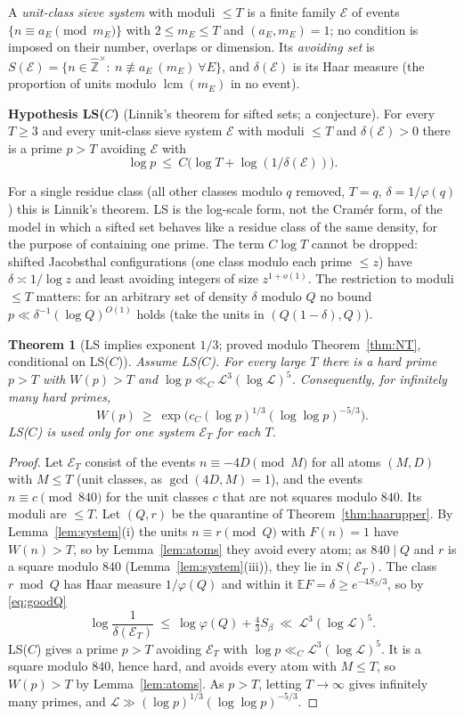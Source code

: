 \documentclass[11pt,reqno]{amsart}
\newtheorem{theorem}{Theorem}[section]
\theoremstyle{definition}
\newcommand{\lcm}{\operatorname{lcm}}
\newcommand{\Lc}{\mathcal L}
\newcommand{\E}{\mathbb E}
\begin{document}
A \emph{unit-class sieve system} with moduli $\le T$ is a finite family $\mathcal E$ of
events $\{n\equiv a_E\pmod{m_E}\}$ with $2\le m_E\le T$ and $(a_E,m_E)=1$; no condition is
imposed on their number, overlaps or dimension.  Its \emph{avoiding set} is
$S(\mathcal E)=\{n\in\hat{\mathbb Z}^\times:\ n\not\equiv a_E\ (m_E)\ \forall E\}$, and $\delta(\mathcal E)$ is its Haar
measure (the proportion of units modulo $\lcm(m_E)$ in no event).

\smallskip\noindent\textbf{Hypothesis LS($C$)} (Linnik's theorem for sifted
sets; a conjecture).  For every $T\ge3$ and every unit-class sieve system $\mathcal E$
with moduli $\le T$ and $\delta(\mathcal E)>0$ there is a prime $p>T$ avoiding $\mathcal E$ with
\[
 \log p\ \le\ C\big(\log T+\log(1/\delta(\mathcal E))\big).
\]

For a single residue class (all other classes modulo $q$ removed, $T=q$,
$\delta=1/\varphi(q)$) this is Linnik's theorem.  LS is the log-scale form, not the
Cram\'er form, of the model in which a sifted set behaves like a residue
class of the same density, for the purpose of containing one prime.  The
term $C\log T$ cannot be dropped: shifted Jacobsthal configurations (one
class modulo each prime $\le z$) have $\delta\asymp1/\log z$ and least avoiding
integers of size $z^{1+o(1)}$.  The restriction to moduli $\le T$ matters: for an
arbitrary set of density $\delta$ modulo $Q$ no bound $p\ll\delta^{-1}(\log Q)^{O(1)}$ holds
(take the units in $(Q(1-\delta),Q)$).

\begin{theorem}[LS implies exponent $1/3$; proved modulo Theorem~\ref{thm:NT}, conditional on LS($C$)]\label{thm:LS}
Assume LS($C$).  For every large $T$ there is a hard prime $p>T$ with
$W(p)>T$ and $\log p\ll_C\Lc^3(\log\Lc)^5$.  Consequently, for infinitely many hard
primes,
\[
 W(p)\ \ge\ \exp\big(c_C(\log p)^{1/3}(\log\log p)^{-5/3}\big).
\]
LS($C$) is used only for one system $\mathcal E_T$ for each $T$.
\end{theorem}

\begin{proof}
Let $\mathcal E_T$ consist of the events $n\equiv-4D\pmod M$ for all atoms $(M,D)$ with
$M\le T$ (unit classes, as $\gcd(4D,M)=1$), and the events $n\equiv c\pmod{840}$ for
the unit classes $c$ that are not squares modulo $840$.  Its moduli are
$\le T$.  Let $(Q,r)$ be the quarantine of Theorem~\ref{thm:haarupper}.  By
Lemma~\ref{lem:system}(i) the units $n\equiv r\pmod Q$ with $F(n)=1$ have $W(n)>T$,
so by Lemma~\ref{lem:atoms} they avoid every atom; as $840\mid Q$ and $r$ is a
square modulo $840$ (Lemma~\ref{lem:system}(iii)), they lie in $S(\mathcal E_T)$.  The
class $r\bmod Q$ has Haar measure $1/\varphi(Q)$ and within it $\E F=\delta\ge e^{-4S_\beta/3}$, so
by \eqref{eq:goodQ}
\[
 \log\frac1{\delta(\mathcal E_T)}\ \le\ \log\varphi(Q)+\tfrac43S_\beta\ \ll\ \Lc^3(\log\Lc)^5 .
\]
LS($C$) gives a prime $p>T$ avoiding $\mathcal E_T$ with $\log p\ll_C\Lc^3(\log\Lc)^5$.  It
is a square modulo $840$, hence hard, and avoids every atom with $M\le T$, so
$W(p)>T$ by Lemma~\ref{lem:atoms}.  As $p>T$, letting $T\to\infty$ gives infinitely
many primes, and $\Lc\gg(\log p)^{1/3}(\log\log p)^{-5/3}$.
\end{proof}
\end{document}
